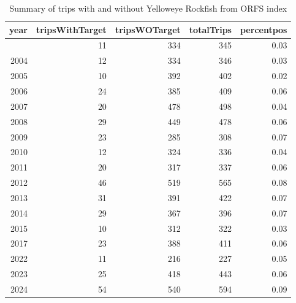 \documentclass[
  english,
]{article}
\begin{document}
\begin{longtable}{rrrrr}

\caption{\label{tbl-yelloweye_percent_pos_ORFS}Summary of trips with and
without Yelloweye Rockfish from ORFS index}

\tabularnewline

\toprule
year & tripsWithTarget & tripsWOTarget & totalTrips & percentpos \\ 
\midrule\addlinespace[2.5pt]
2001 & 11 & 334 & 345 & 0.03 \\ 
2004 & 12 & 334 & 346 & 0.03 \\ 
2005 & 10 & 392 & 402 & 0.02 \\ 
2006 & 24 & 385 & 409 & 0.06 \\ 
2007 & 20 & 478 & 498 & 0.04 \\ 
2008 & 29 & 449 & 478 & 0.06 \\ 
2009 & 23 & 285 & 308 & 0.07 \\ 
2010 & 12 & 324 & 336 & 0.04 \\ 
2011 & 20 & 317 & 337 & 0.06 \\ 
2012 & 46 & 519 & 565 & 0.08 \\ 
2013 & 31 & 391 & 422 & 0.07 \\ 
2014 & 29 & 367 & 396 & 0.07 \\ 
2015 & 10 & 312 & 322 & 0.03 \\ 
2017 & 23 & 388 & 411 & 0.06 \\ 
2022 & 11 & 216 & 227 & 0.05 \\ 
2023 & 25 & 418 & 443 & 0.06 \\ 
2024 & 54 & 540 & 594 & 0.09 \\ 
\bottomrule

\end{longtable}

\endgroup

\begingroup
\fontsize{9.0pt}{11.0pt}\selectfont
\end{document}
